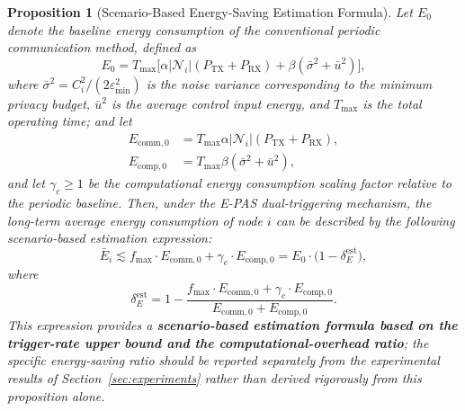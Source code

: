 \documentclass[10pt]{article}
\newtheorem{proposition}[theorem]{Proposition}
\newcommand{\EPAS}{E-PAS}
\newcommand{\fmax}{f_{\max}}
\begin{document}
\begin{proposition}[Scenario-Based Energy-Saving Estimation Formula]\label{thm:energy}
  Let $E_0$ denote the baseline energy consumption of the conventional periodic communication method, defined as
  \begin{equation}\label{eq:E0}
    E_0 = T_{\max}\bigl[\alpha|\mathcal{N}_i|(P_{\mathrm{TX}}+P_{\mathrm{RX}}) + \beta(\bar{\sigma}^2 + \bar{u}^2)\bigr],
  \end{equation}
  where $\bar{\sigma}^2 = C_i^2/(2\varepsilon_{\min}^2)$ is the noise variance corresponding to the minimum privacy budget, $\bar{u}^2$ is the average control input energy, and $T_{\max}$ is the total operating time; and let
  \[
    \begin{aligned}
      E_{\mathrm{comm},0}
      &=T_{\max}\alpha|\mathcal{N}_i|(P_{\mathrm{TX}}+P_{\mathrm{RX}}),\\
      E_{\mathrm{comp},0}
      &=T_{\max}\beta(\bar{\sigma}^2+\bar{u}^2),
    \end{aligned}
  \]
  and let $\gamma_c\geq1$ be the computational energy consumption scaling factor relative to the periodic baseline. Then, under the \EPAS{} dual-triggering mechanism, the long-term average energy consumption of node $i$ can be described by the following scenario-based estimation expression:
  \begin{equation}\label{eq:energy_bound}
    \bar{E}_i \lesssim \fmax \cdot E_{\mathrm{comm},0} + \gamma_c \cdot E_{\mathrm{comp},0}
    = E_0 \cdot \bigl(1-\delta_E^{\mathrm{est}}\bigr),
  \end{equation}
  where
  \begin{equation}\label{eq:delta_est}
    \delta_E^{\mathrm{est}}
    =
    1-\frac{\fmax \cdot E_{\mathrm{comm},0} + \gamma_c \cdot E_{\mathrm{comp},0}}{E_{\mathrm{comm},0} + E_{\mathrm{comp},0}}.
  \end{equation}
  This expression provides a \textbf{scenario-based estimation formula based on the trigger-rate upper bound and the computational-overhead ratio}; the specific energy-saving ratio should be reported separately from the experimental results of Section~\ref{sec:experiments} rather than derived rigorously from this proposition alone.
\end{proposition}
\end{document}

